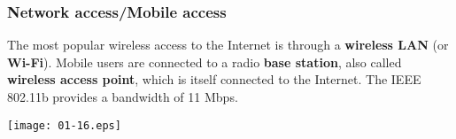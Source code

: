 %
\begin{frame}
\frametitle{Network access/Mobile access}

The most popular wireless access to the Internet is through a
\textbf{wireless LAN} (or \textbf{Wi-Fi}). Mobile users are connected
to a radio \textbf{base station}, also called \textbf{wireless access
point}, which is itself connected to the Internet. The IEEE 802.11b
provides a bandwidth of 11 Mbps.

\begin{center}
\texttt{[image: 01-16.eps]}
\end{center}

\end{frame}
